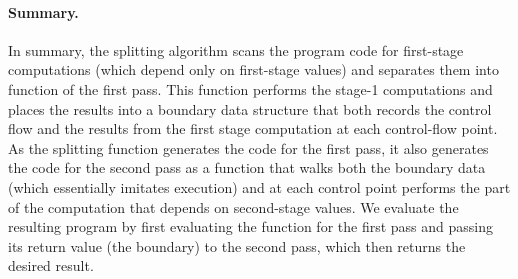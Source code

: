 \begin{abstrsyn}
\paragraph{Summary.}
In summary, the splitting algorithm scans the program code for
first-stage computations (which depend only on first-stage values) and
separates them into function of the first pass. This function performs
the stage-1 computations and places the results into a boundary data
structure that both records the control flow and the results from the
first stage computation at each control-flow point.  As the splitting
function generates the code for the first pass, it also generates the
code for the second pass as a function that walks both the boundary
data (which essentially imitates execution) and at each control point
performs the part of the computation that depends on second-stage
values. We evaluate the resulting program by first evaluating the
function for the first pass and passing its return value (the
boundary) to the second pass, which then returns the desired result.



\begin{comment}

An astute programmer, having noticed that \texttt{quickselect} can be staged in
this fashion, might try to split it into a pair of functions, one which performs
all the work depending only on \texttt{l} (the first stage), and one which uses
that partial result and \texttt{k} to compute the element with
rank \texttt{k} in \texttt{l}. 

Intuitively, \texttt{l} determines the result of all calls to
\texttt{part}ition, and \texttt{k} only determines which calls are made. So we
can preprocess \texttt{l} by recursively dividing it into halves smaller and
greater than the pivot---that is, building a binary search tree. Then, once we
have \texttt{k}, we can recur on this tree, choosing whichever branch has the
\texttt{k}${}^\textit{th}$ leftmost element until we reach a leaf. And because
\texttt{part}ition contains no second-stage code, we can run it entirely in the
first stage.

We have implemented this splitting of quickselect in \ref{fig:qs-split}.
\texttt{qSelect1} builds a binary search tree from the list \texttt{l}, and
\texttt{qSelect2} takes such a tree and a rank \texttt{k} and computes the
answer. This allows us to efficiently perform many order statistics queries on
\texttt{l} by caching the tree and reusing it for many different ranks
$\mathtt{k_1},\dots,\mathtt{k_m}$:
%
\begin{lstlisting}
let b = qSelect1 l in
  qSelect2 b @$k_1$@
  qSelect2 b @$k_2$@
   @$\vdots$@ 
  qSelect2 b @$k_m$@.
\end{lstlisting}


\end{comment}
\end{abstrsyn}
